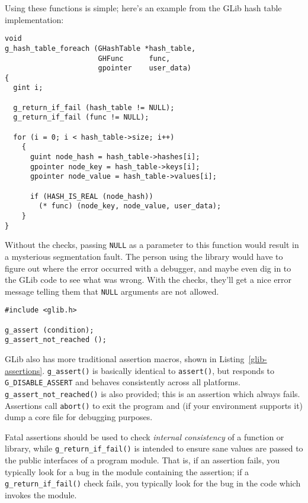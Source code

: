 Using these functions is simple; here's an example from the GLib hash table implementation:
\begin{lstlisting}
void
g_hash_table_foreach (GHashTable *hash_table,
                      GHFunc      func,
                      gpointer    user_data)
{
  gint i;

  g_return_if_fail (hash_table != NULL);
  g_return_if_fail (func != NULL);

  for (i = 0; i < hash_table->size; i++)
    {
      guint node_hash = hash_table->hashes[i];
      gpointer node_key = hash_table->keys[i];
      gpointer node_value = hash_table->values[i];

      if (HASH_IS_REAL (node_hash))
        (* func) (node_key, node_value, user_data);
    }
}
\end{lstlisting}

Without the checks, passing \lstinline{NULL} as a parameter to this function would result in a mysterious segmentation fault. The person using the library would have to figure out where the error occurred with a debugger, and maybe even dig in to the GLib code to see what was wrong. With the checks, they'll get a nice error message telling them that \lstinline{NULL} arguments are not allowed.

\begin{lstlisting}[float, caption={Assertions}, label=glib-assertions]
#include <glib.h>

g_assert (condition);
g_assert_not_reached ();
\end{lstlisting}

GLib also has more traditional assertion macros, shown in Listing~\ref{glib-assertions}. \lstinline{g_assert()} is basically identical to \lstinline{assert()}, but responds to \lstinline{G_DISABLE_ASSERT} and behaves consistently across all platforms. \lstinline{g_assert_not_reached()} is also provided; this is an assertion which always fails. Assertions call \lstinline{abort()} to exit the program and (if your environment supports it) dump a core file for debugging purposes.

Fatal assertions should be used to check \emph{internal consistency} of a function or library, while \lstinline{g_return_if_fail()} is intended to ensure sane values are passed to the public interfaces of a program module. That is, if an assertion fails, you typically look for a bug in the module containing the assertion; if a \lstinline{g_return_if_fail()} check fails, you typically look for the bug in the code which invokes the module.


